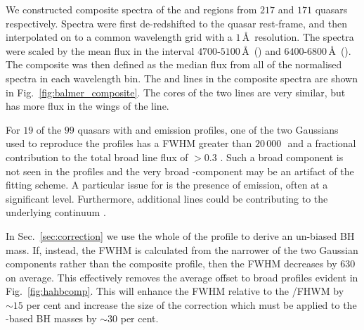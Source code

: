 We constructed composite spectra of the \ha and \hb regions from $217$ and $171$ quasars respectively. 
Spectra were first de-redshifted to the quasar rest-frame, and then interpolated on to a common wavelength grid with a $1$\,\AA\, resolution. 
The spectra were scaled by the mean flux in the interval $4700$-$5100$\,\AA\, (\hbns) and $6400$-$6800$\,\AA\, (\hans). 
The composite was then defined as the median flux from all of the normalised spectra in each wavelength bin. 
The \ha and \hb lines in the composite spectra are shown in Fig.~\ref{fig:balmer_composite}.
The cores of the two lines are very similar, but \hb has more flux in the wings of the line. 

For $19$ of the $99$ quasars with \hb and \ha emission profiles, one of the two Gaussians used to reproduce the \hb profiles has a FWHM greater than $20$\,$000$\,\kms\, and a fractional contribution to the total \hb broad line flux of $>0.3$ \citep{marziani09,marziani13}.  
Such a broad component is not seen in the \ha profiles and the very broad \hbns-component may be an artifact of the fitting scheme.
A particular issue for \hb is the presence of  emission, often at a significant level.
Furthermore, additional lines could be contributing to the underlying continuum \citep[e.g. the \ll$4922$,$5017$ doublet;][]{veron02,zamfir10}. 

In Sec.~\ref{sec:correction} we use the whole of the \hb profile to derive an un-biased BH mass.  
If, instead, the FWHM is calculated from the narrower of the two Gaussian components rather than the composite profile, then the \hb FWHM decreases by $630$\,\kms\, on average.
This effectively removes the average offset to broad \hb profiles evident in Fig.~\ref{fig:hahbcomp}. 
This will enhance the  FWHM relative to the \hans/\hb FHWM by $\sim15$ per cent and increase the size of the correction which must be applied to the -based BH masses by $\sim30$ per cent. 

